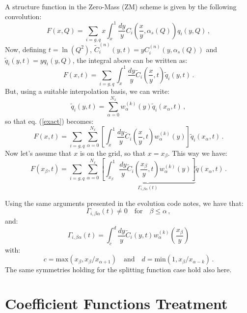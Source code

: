 \documentclass[10pt,a4paper]{article}
\begin{document}
A structure function in the Zero-Mass (ZM) scheme is given by the
following convolution:
\begin{equation}
F(x,Q) = \sum_{i=g,q}x\int_x^1\frac{dy}y C_i\left(\frac{x}{y},\alpha_s(Q)\right)q_i(y,Q)\,,
\end{equation}
Now, defining $t = \ln (Q^2)$, $\widetilde{C}_i^{(n)}(y,t) = yC_i^{(n)}(y,\alpha_s(Q))$
and $\widetilde{q}_i(y,t) = y q_i(y,Q)$, the integral above can be
written as:
\begin{equation}\label{exact}
F(x,t) = \sum_{i=g,q}\int_x^1\frac{dy}y \widetilde{C}_i\left(\frac{x}{y},t\right)\widetilde{q}_i(y,t)\,.
\end{equation}
But, using a suitable interpolation basis, we can write:
\begin{equation}
\tilde{q}_i(y,t)=\sum^{N_{x}}_{\alpha=0}w_{\alpha}^{(k)}(y)\tilde{q}_i(x_{\alpha},t)\,,
\end{equation}
so that eq. (\ref{exact}) becomes:
\begin{equation}
F(x,t) = \sum_{i=g,q}\sum^{N_{x}}_{\alpha=0}\left[\int_x^1\frac{dy}y \widetilde{C}_i\left(\frac{x}{y},t\right) w_{\alpha}^{(k)}(y)\right]\tilde{q}_i(x_{\alpha},t)\,.
\end{equation}
Now let's assume that $x$ is on the grid, so that $x = x_\beta$. This
way we have:
\begin{equation}
F(x_\beta,t) = \sum_{i=g,q}\sum^{N_{x}}_{\alpha=0}\underbrace{\left[\int_{x_\beta}^1\frac{dy}y \widetilde{C}_i\left(\frac{x_\beta}{y},t\right) w_{\alpha}^{(k)}(y)\right]}_{\Gamma_{i,\beta\alpha}(t)}\tilde{q}(x_{\alpha},t)\,.
\end{equation}

Using the same arguments presented in the evolution code notes, we
have that:
\begin{equation}
\Gamma_{i,\beta\alpha}(t) \neq 0 \quad\mbox{for}\quad\beta\leq\alpha\,,
\end{equation}
and:
\begin{equation}
\Gamma_{i,\beta\alpha}(t) = \int_{c}^d\frac{dy}y \widetilde{C}_i\left(y,t\right) w_{\alpha}^{(k)}\left(\frac{x_\beta}{y}\right)
\end{equation}
with:
\begin{equation}\label{bounds2}
c =  \mbox{max}(x_\beta,x_\beta/x_{\alpha+1}) \quad\mbox{and}\quad d = \mbox{min}(1,x_\beta/x_{\alpha-k}) \,.
\end{equation}
The same symmetries holding for the splitting function case hold also here.

\section{Coefficient Functions Treatment}
\end{document}
